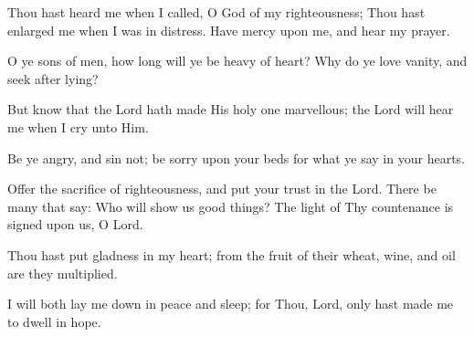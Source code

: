 Thou hast heard me when I called, O God of my righteousness; Thou hast enlarged me when I was in distress. Have mercy upon me, and hear my prayer.

O ye sons of men, how long will ye be heavy of heart? Why do ye love vanity, and seek after lying?

But know that the Lord hath made His holy one marvellous; the Lord will hear me when I cry unto Him.

Be ye angry, and sin not; be sorry upon your beds for what ye say in your hearts.

Offer the sacrifice of righteousness, and put your trust in the Lord. There be many that say: Who will show us good things? The light of Thy countenance is signed upon us, O Lord.

Thou hast put gladness in my heart; from the fruit of their wheat, wine, and oil are they multiplied.

I will both lay me down in peace and sleep; for Thou, Lord, only hast made me to dwell in hope.
